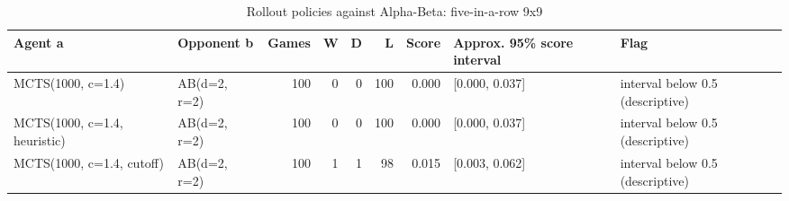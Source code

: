 \begin{table}[!t]
\centering
\caption{Rollout policies against Alpha-Beta: five-in-a-row 9x9}
\label{tab:rollout_vs_ab_gomoku9}
\small
\begin{tabular}{llrrrrrll}
\toprule
Agent a & Opponent b & Games & W & D & L & Score & Approx. 95\% score interval & Flag \\
\midrule
MCTS(1000, c=1.4) & AB(d=2, r=2) & 100 & 0 & 0 & 100 & 0.000 & [0.000, 0.037] & interval below 0.5 (descriptive) \\
MCTS(1000, c=1.4, heuristic) & AB(d=2, r=2) & 100 & 0 & 0 & 100 & 0.000 & [0.000, 0.037] & interval below 0.5 (descriptive) \\
MCTS(1000, c=1.4, cutoff) & AB(d=2, r=2) & 100 & 1 & 1 & 98 & 0.015 & [0.003, 0.062] & interval below 0.5 (descriptive) \\
\bottomrule
\end{tabular}
\end{table}
